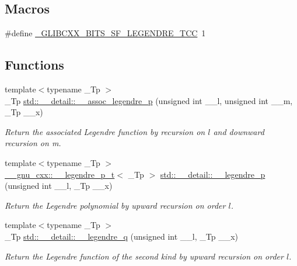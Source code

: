 \subsection*{Macros}
\begin{DoxyCompactItemize}
\item 
\#define \hyperlink{sf__legendre_8tcc_adf9a610f8b35f611eab3b1894e967c9f}{\+\_\+\+G\+L\+I\+B\+C\+X\+X\+\_\+\+B\+I\+T\+S\+\_\+\+S\+F\+\_\+\+L\+E\+G\+E\+N\+D\+R\+E\+\_\+\+T\+CC}~1
\end{DoxyCompactItemize}
\subsection*{Functions}
\begin{DoxyCompactItemize}
\item 
{\footnotesize template$<$typename \+\_\+\+Tp $>$ }\\\+\_\+\+Tp \hyperlink{namespacestd_1_1____detail_a8b31886e334427566b1b00d71052191b}{std\+::\+\_\+\+\_\+detail\+::\+\_\+\+\_\+assoc\+\_\+legendre\+\_\+p} (unsigned int \+\_\+\+\_\+l, unsigned int \+\_\+\+\_\+m, \+\_\+\+Tp \+\_\+\+\_\+x)
\begin{DoxyCompactList}\small\item\em Return the associated Legendre function by recursion on $ l $ and downward recursion on m. \end{DoxyCompactList}\item 
{\footnotesize template$<$typename \+\_\+\+Tp $>$ }\\\hyperlink{struct____gnu__cxx_1_1____legendre__p__t}{\+\_\+\+\_\+gnu\+\_\+cxx\+::\+\_\+\+\_\+legendre\+\_\+p\+\_\+t}$<$ \+\_\+\+Tp $>$ \hyperlink{namespacestd_1_1____detail_ab06b50bbac9758b5a2cc7d3d8213daa9}{std\+::\+\_\+\+\_\+detail\+::\+\_\+\+\_\+legendre\+\_\+p} (unsigned int \+\_\+\+\_\+l, \+\_\+\+Tp \+\_\+\+\_\+x)
\begin{DoxyCompactList}\small\item\em Return the Legendre polynomial by upward recursion on order $ l $. \end{DoxyCompactList}\item 
{\footnotesize template$<$typename \+\_\+\+Tp $>$ }\\\+\_\+\+Tp \hyperlink{namespacestd_1_1____detail_a0643760e0d1701df4db880b2ad969055}{std\+::\+\_\+\+\_\+detail\+::\+\_\+\+\_\+legendre\+\_\+q} (unsigned int \+\_\+\+\_\+l, \+\_\+\+Tp \+\_\+\+\_\+x)
\begin{DoxyCompactList}\small\item\em Return the Legendre function of the second kind by upward recursion on order $ l $. \end{DoxyCompactList}\item 

\end{DoxyCompactItemize}
